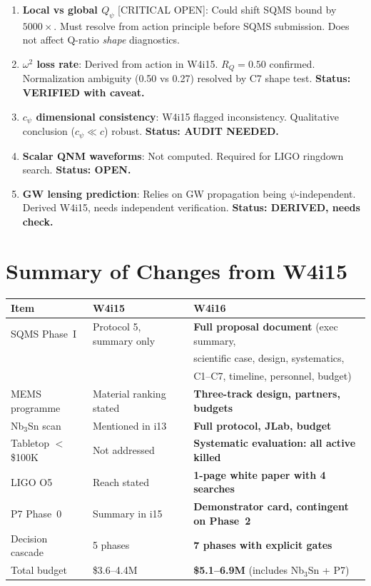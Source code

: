 \documentclass[11pt]{article}
\newcommand{\Qpsi}{Q_\psi}
\begin{document}
\begin{enumerate}
\item \textbf{Local vs global $\Qpsi$} [CRITICAL OPEN]: Could shift
  SQMS bound by $5000\times$. Must resolve from action principle before
  SQMS submission. Does not affect Q-ratio \emph{shape} diagnostics.

\item \textbf{$\omega^2$ loss rate}: Derived from action in W4i15.
  $R_Q = 0.50$ confirmed. Normalization ambiguity (0.50 vs 0.27)
  resolved by C7 shape test. \textbf{Status: VERIFIED with caveat.}

\item \textbf{$c_\psi$ dimensional consistency}: W4i15 flagged
  inconsistency. Qualitative conclusion ($c_\psi \ll c$) robust.
  \textbf{Status: AUDIT NEEDED.}

\item \textbf{Scalar QNM waveforms}: Not computed. Required for LIGO
  ringdown search. \textbf{Status: OPEN.}

\item \textbf{GW lensing prediction}: Relies on GW propagation being
  $\psi$-independent. Derived W4i15, needs independent verification.
  \textbf{Status: DERIVED, needs check.}
\end{enumerate}


\section*{Summary of Changes from W4i15}

\begin{center}
\renewcommand{\arraystretch}{1.2}
\begin{tabular}{@{}lll@{}}
\toprule
\textbf{Item} & \textbf{W4i15} & \textbf{W4i16} \\
\midrule
SQMS Phase~I & Protocol 5, summary only & \textbf{Full proposal
  document} (exec summary, \\
& & scientific case, design, systematics, \\
& & C1--C7, timeline, personnel, budget) \\
MEMS programme & Material ranking stated & \textbf{Three-track design,
  partners, budgets} \\
Nb$_3$Sn scan & Mentioned in i13 & \textbf{Full protocol, JLab,
  budget} \\
Tabletop $<$\$100K & Not addressed & \textbf{Systematic evaluation:
  all active killed} \\
LIGO O5 & Reach stated & \textbf{1-page white paper with 4 searches} \\
P7 Phase~0 & Summary in i15 & \textbf{Demonstrator card, contingent
  on Phase~2} \\
Decision cascade & 5 phases & \textbf{7 phases with explicit gates} \\
Total budget & \$3.6--4.4M & \textbf{\$5.1--6.9M} (includes Nb$_3$Sn
  + P7) \\
\bottomrule
\end{tabular}
\end{center}
\end{document}

